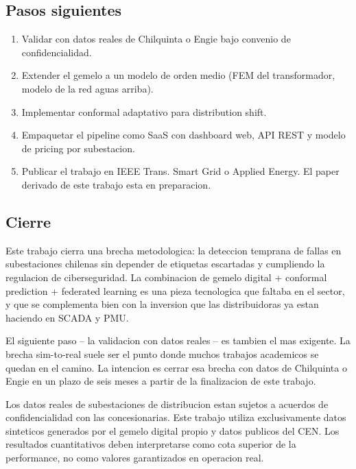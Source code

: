 \subsection{Pasos siguientes}

\begin{enumerate}[leftmargin=*,itemsep=4pt]
  \item Validar con datos reales de Chilquinta o Engie bajo
        convenio de confidencialidad.
  \item Extender el gemelo a un modelo de orden medio
        (FEM del transformador, modelo de la red aguas arriba).
  \item Implementar conformal adaptativo para distribution
        shift.
  \item Empaquetar el pipeline como SaaS con dashboard
        web, API REST y modelo de pricing por subestacion.
  \item Publicar el trabajo en IEEE Trans. Smart Grid o
        Applied Energy. El paper derivado de este trabajo esta
        en preparacion.
\end{enumerate}

\subsection{Cierre}

Este trabajo cierra una brecha metodologica: la deteccion temprana
de fallas en subestaciones chilenas sin depender de etiquetas
escartadas y cumpliendo la regulacion de ciberseguridad. La
combinacion de gemelo digital + conformal prediction + federated
learning es una pieza tecnologica que faltaba en el sector, y que
se complementa bien con la inversion que las distribuidoras ya estan
haciendo en SCADA y PMU.

El siguiente paso -- la validacion con datos reales -- es tambien
el mas exigente. La brecha sim-to-real suele ser el punto donde
muchos trabajos academicos se quedan en el camino. La intencion
es cerrar esa brecha con datos de Chilquinta o Engie en un plazo
de seis meses a partir de la finalizacion de este trabajo.

\begin{tcolorbox}[colback=green!3,colframe=green!50!black,title=Disclaimer]
\small
Los datos reales de subestaciones de distribucion estan sujetos a
acuerdos de confidencialidad con las concesionarias. Este trabajo
utiliza exclusivamente datos sinteticos generados por el gemelo
digital propio y datos publicos del CEN. Los resultados
cuantitativos deben interpretarse como cota superior de la
performance, no como valores garantizados en operacion real.
\end{tcolorbox}